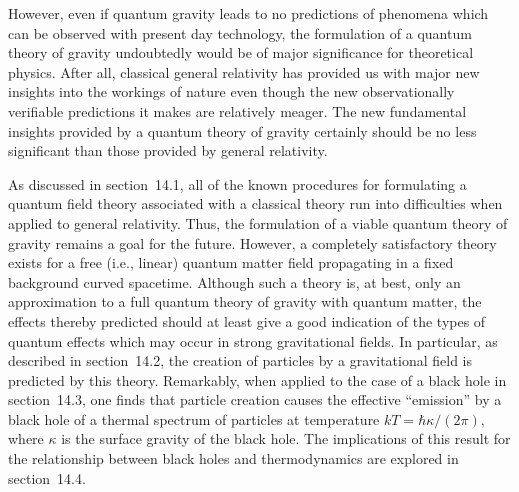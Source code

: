 However, even if quantum gravity leads to no predictions of phenomena which
can be observed with present day technology, the formulation of a quantum theory
of gravity undoubtedly would be of major significance for theoretical physics. After
all, classical general relativity has provided us with major new insights into the
workings of nature even though the new observationally verifiable predictions it
makes are relatively meager. The new fundamental insights provided by a quantum
theory of gravity certainly should be no less significant than those provided by
general relativity.

As discussed in section~14.1, all of the known procedures for formulating a
quantum field theory associated with a classical theory run into difficulties when
applied to general relativity. Thus, the formulation of a viable quantum theory of
gravity remains a goal for the future. However, a completely satisfactory theory
exists for a free (i.e., linear) quantum matter field propagating in a fixed background
curved spacetime. Although such a theory is, at best, only an approximation to a full
quantum theory of gravity with quantum matter, the effects thereby predicted should
at least give a good indication of the types of quantum effects which may occur in
strong gravitational fields. In particular, as described in section~14.2, the creation of
particles by a gravitational field is predicted by this theory. Remarkably, when
applied to the case of a black hole in section~14.3, one finds that particle creation
causes the effective ``emission'' by a black hole of a thermal spectrum of particles at
temperature \(kT=\hbar\kappa/(2\pi)\), where \(\kappa\) is the surface gravity of the black hole.
The implications of this result for the relationship between black holes and
thermodynamics are explored in section~14.4.
